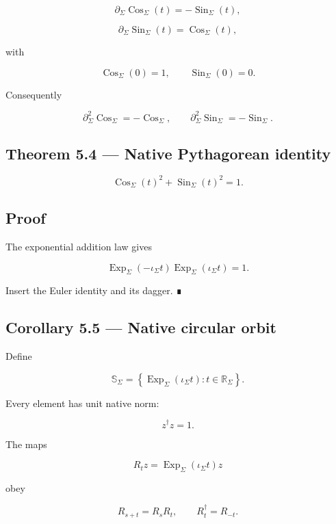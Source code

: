 \[
\partial_\Sigma\operatorname{Cos}_\Sigma(t)
=-\operatorname{Sin}_\Sigma(t),
\]

\[
\partial_\Sigma\operatorname{Sin}_\Sigma(t)
=\operatorname{Cos}_\Sigma(t),
\]

with

\[
\operatorname{Cos}_\Sigma(0)=1,
\qquad
\operatorname{Sin}_\Sigma(0)=0.
\]

Consequently

\[
\partial_\Sigma^2\operatorname{Cos}_\Sigma
=-\operatorname{Cos}_\Sigma,
\qquad
\partial_\Sigma^2\operatorname{Sin}_\Sigma
=-\operatorname{Sin}_\Sigma.
\]

\hypertarget{theorem-5.4-native-pythagorean-identity}{%
\subsection{Theorem 5.4 --- Native Pythagorean identity}\label{theorem-5.4-native-pythagorean-identity}}

\[
\boxed{
\operatorname{Cos}_\Sigma(t)^2
+
\operatorname{Sin}_\Sigma(t)^2
=1.
}
\]

\hypertarget{proof-6}{%
\subsection{Proof}\label{proof-6}}

The exponential addition law gives

\[
\operatorname{Exp}_\Sigma(-\iota_\Sigma t)
\operatorname{Exp}_\Sigma(\iota_\Sigma t)=1.
\]

Insert the Euler identity and its dagger. ∎

\hypertarget{corollary-5.5-native-circular-orbit}{%
\subsection{Corollary 5.5 --- Native circular orbit}\label{corollary-5.5-native-circular-orbit}}

Define

\[
\mathbb S_\Sigma
=
\left\{
\operatorname{Exp}_\Sigma(\iota_\Sigma t)
:
t\in\mathbb R_\Sigma
\right\}.
\]

Every element has unit native norm:

\[
z^\dagger z=1.
\]

The maps

\[
R_tz
=
\operatorname{Exp}_\Sigma(\iota_\Sigma t)z
\]

obey

\[
R_{s+t}=R_sR_t,
\qquad
R_t^\dagger=R_{-t}.
\]

